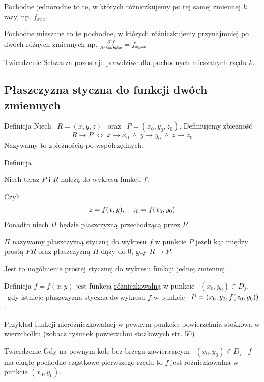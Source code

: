Pochodne jednorodne to te, w których różniczkujemy po tej samej zmiennej $k$ razy, np. $f_{xxx}$.

Pochodne mieszane to te pochodne, w których różniczkujemy przynajmniej po dwóch różnych zmiennych np. $ \frac{\partial^4 f}{\partial x \partial x \partial y \partial x} = f_{xyxx} $

Twierdzenie Schwarza pozostaje prawdziwe dla pochodnych mieszanych rzędu $k$.

\subsection{Płaszczyzna styczna do funkcji dwóch zmiennych}

\begin{tw}{Definicja}
Niech \ $ R = (x,y,z) $ \ oraz \ $ P = (x_0, y_0, z_0) $. Definiujemy zbieżność
\[ R \to P \ \Leftrightarrow \ x \to x_0 \ \land \ y \to y_0 \ \land \ z \to z_0 \]
Nazywamy to zbieżnością po współrzędnych.

\end{tw}

\begin{tw}{Definicja}

Niech teraz $P$ i $R$ należą do wykresu funkcji $f$. 

Czyli 
\[ z = f(x,y), \quad z_0 = f(x_0, y_0) \]
Ponadto niech $ \Pi $ będzie płaszczyzną przechodzącą przez $P$.

$\Pi$ nazywamy \underline{płaszczyzną styczną} do wykresu $f$ w punkcie $P$ jeżeli kąt między prostą $PR$ oraz płaszczyzną $\Pi$ dąży do 0, gdy $R \to P$.

Jest to uogólnienie prostej stycznej do wykresu funkcji jednej zmiennej.
\end{tw}

\begin{tw}{Definicja}
$ f = f(x,y) $ jest funkcją \underline{różniczkowalną} w punkcie \ $(x_0, y_0) \in D_f$, \ gdy istnieje płaszczyzna styczna do wykresu $f$
w punkcie \ $ P = (x_0, y_0, f(x_0, y_0)) $.
\end{tw}

Przykład funkcji nieróżniczkowalnej w pewnym punkcie: powierzchnia stożkowa w wierzchołku (zobacz rysunek powierzchni stożkowych str. 50)

\begin{tw}{Twierdzenie}
Gdy na pewnym kole bez brzegu zawierającym \ $(x_0, y_0) \in D_f $ \ $f$ ma ciągłe pochodne cząstkowe pierwszego rzędu to $f$ jest różniczkowalna w punkcie $(x_0, y_0)$.
\end{tw}

